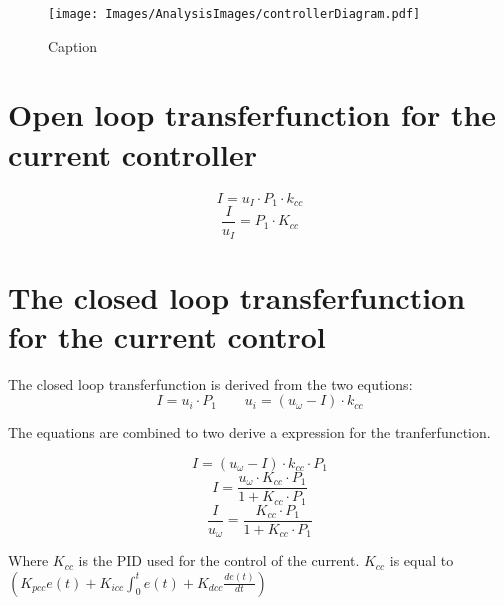 \documentclass[../../main.tex]{subfiles}
\begin{document}
\begin{figure}
    \centering
    \texttt{[image: Images/AnalysisImages/controllerDiagram.pdf]}
    \caption{Caption}
    \label{fig:system_diagram}
\end{figure}

\section{Open loop transferfunction for the current controller}

\begin{equation}
    I = u_{I} \cdot P_1\cdot k_{cc}
\end{equation}
\begin{equation}
    \frac{I}{u_{I}} = P_1\cdot K_{cc} 
\end{equation}
     




\section{The closed loop transferfunction for the current control}

The closed loop transferfunction is derived from the two equtions: 
\begin{equation}
    I = u_i \cdot P_1 \quad \quad
    u_i = (u_{\omega}-I)\cdot k_{cc}
\end{equation}

The equations are combined to two derive a expression for the tranferfunction. 

\begin{equation}
    I = (u_{\omega}-I)\cdot k_{cc}\cdot P_1
\end{equation}
\begin{equation}
    I = \frac{u_{\omega}\cdot K_{cc}\cdot P_1}{1+K_{cc}\cdot P_1}
\end{equation}
\begin{equation}
    \frac{I}{u_{\omega}} =  \frac{ K_{cc}\cdot P_1}{1+K_{cc}\cdot P_1}
\end{equation}

Where $K_{cc}$ is the PID used for the control of the current. $K_{cc}$  is equal to $(K_{pcc} e(t) + K_{icc}\int_0^t e(t) + K_{dcc}\frac{de(t)}{dt})$
\end{document}
